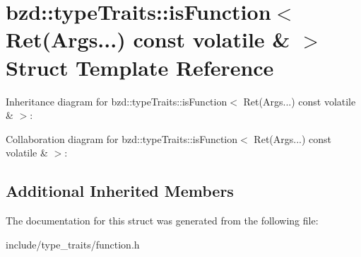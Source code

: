\hypertarget{structbzd_1_1typeTraits_1_1isFunction_3_01Ret_07Args_8_8_8_08_01const_01volatile_01_6_01_4}{}\section{bzd\+:\+:type\+Traits\+:\+:is\+Function$<$ Ret(Args...) const volatile \& $>$ Struct Template Reference}
\label{structbzd_1_1typeTraits_1_1isFunction_3_01Ret_07Args_8_8_8_08_01const_01volatile_01_6_01_4}


Inheritance diagram for bzd\+:\+:type\+Traits\+:\+:is\+Function$<$ Ret(Args...) const volatile \& $>$\+:


Collaboration diagram for bzd\+:\+:type\+Traits\+:\+:is\+Function$<$ Ret(Args...) const volatile \& $>$\+:
\subsection*{Additional Inherited Members}


The documentation for this struct was generated from the following file\+:\begin{DoxyCompactItemize}
\item 
include/type\+\_\+traits/function.\+h\end{DoxyCompactItemize}
